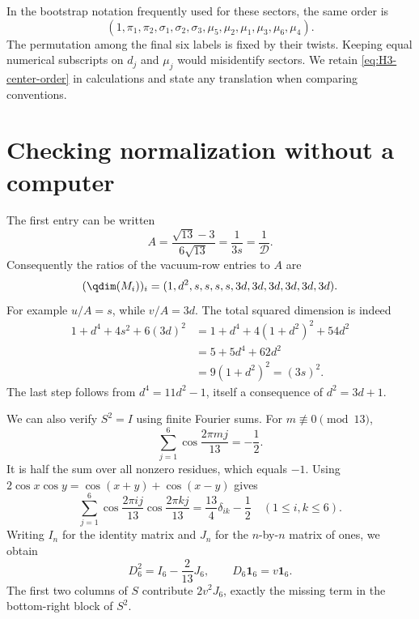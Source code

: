 In the bootstrap notation frequently used for these sectors, the
same order is
\[
 (1,\pi_1,\pi_2,\sigma_1,\sigma_2,\sigma_3,
 \mu_5,\mu_2,\mu_1,\mu_3,\mu_6,\mu_4).
\]
The permutation among the final six labels is fixed by their twists.
Keeping equal numerical subscripts on $d_j$ and $\mu_j$ would
misidentify sectors.  We retain \eqref{eq:H3-center-order} in
calculations and state any translation when comparing conventions.

\section{Checking normalization without a computer}

The first entry can be written
\[
 A=\frac{\sqrt{13}-3}{6\sqrt{13}}
 =\frac1{3s}=\frac1{\mathcal D}.
\]
Consequently the ratios of the vacuum-row entries to $A$ are
\begin{equation}
 (\qdim(M_i))_i=(1,d^2,s,s,s,s,3d,3d,3d,3d,3d,3d).
 \label{eq:H3-central-dimensions}
\end{equation}
For example $u/A=s$, while $v/A=3d$.  The total squared dimension
is indeed
\begin{align*}
 1+d^4+4s^2+6(3d)^2
 &=1+d^4+4(1+d^2)^2+54d^2\\
 &=5+5d^4+62d^2\\
 &=9(1+d^2)^2=(3s)^2.
\end{align*}
The last step follows from $d^4=11d^2-1$, itself a consequence
of $d^2=3d+1$.

We can also verify $S^2=I$ using finite Fourier sums.  For
$m\not\equiv0\pmod{13}$,
\begin{equation}
 \sum_{j=1}^6\cos\frac{2\pi mj}{13}=-\frac12.
 \label{eq:cos13-sum}
\end{equation}
It is half the sum over all nonzero residues, which equals $-1$.
Using $2\cos x\cos y=\cos(x+y)+\cos(x-y)$ gives
\begin{equation}
 \sum_{j=1}^6
 \cos\frac{2\pi ij}{13}\cos\frac{2\pi kj}{13}
 =\frac{13}{4}\delta_{ik}-\frac12
 \quad(1\leq i,k\leq6).
 \label{eq:cos13-orthogonality}
\end{equation}
Writing $I_n$ for the identity matrix and $J_n$ for the $n$-by-$n$
matrix of ones, we obtain
\[
 D_6^2=I_6-\frac2{13}J_6,
 \qquad D_6\mathbf1_6=v\mathbf1_6.
\]
The first two columns of $S$ contribute $2v^2J_6$, exactly the
missing term in the bottom-right block of $S^2$.

